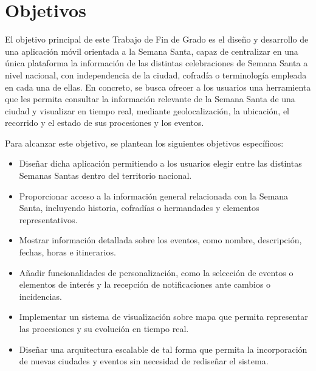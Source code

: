\section{Objetivos}\label{cap:objetivos}

El objetivo principal de este Trabajo de Fin de Grado es el diseño y desarrollo de una aplicación móvil orientada a la Semana Santa, capaz de centralizar en una única plataforma la información de las distintas celebraciones de Semana Santa a nivel nacional, con independencia de la ciudad, cofradía o terminología empleada en cada una de ellas. En concreto, se busca ofrecer a los usuarios una herramienta que les permita consultar la información relevante de la Semana Santa de una ciudad y visualizar en tiempo real, mediante geolocalización, la ubicación, el recorrido y el estado de sus procesiones y los eventos.

Para alcanzar este objetivo, se plantean los siguientes objetivos específicos:

\begin{itemize}
\item Diseñar dicha aplicación permitiendo a los usuarios elegir entre las distintas Semanas Santas dentro del territorio nacional.
\item Proporcionar acceso a la información general relacionada con la Semana Santa, incluyendo historia, cofradías o hermandades y elementos representativos.
\item Mostrar información detallada sobre los eventos, como nombre, descripción, fechas, horas e itinerarios.
\item Añadir funcionalidades de personalización, como la selección de eventos o elementos de interés y la recepción de notificaciones ante cambios o incidencias.
\item Implementar un sistema de visualización sobre mapa que permita representar las procesiones y su evolución en tiempo real.
\item Diseñar una arquitectura escalable de tal forma que permita la incorporación de nuevas ciudades y eventos sin necesidad de rediseñar el sistema.
\end{itemize}
